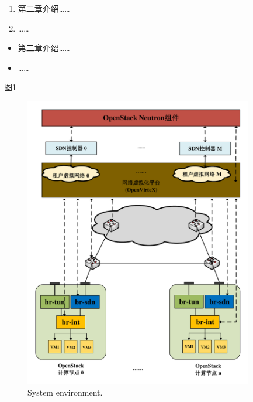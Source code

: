 \begin{enumerate}
\item 第二章介绍……
\item ……
\end{enumerate}
\begin{itemize}
\item 第二章介绍……
\item ……
\end{itemize}
图\ref{fig:env1}
\begin{figure}[!htb]
  \centering
  \includegraphics[width=100mm]{logo/architecture}
  \caption{System environment.}
  \label{fig:env1}
\end{figure}

\ifx\usechapbib\empty
\nocite{BSTcontrol}
\setcounter{NAT@ctr}{0}


\fi
